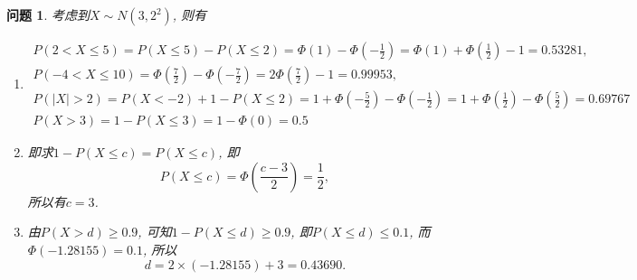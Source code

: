 \documentclass[a4paper]{article}
\theoremstyle{mystyle}
\newtheorem{prob}{问题}[section]
\begin{document}
	\setcounter{prob}{25}
	\begin{prob}
		考虑到$X\sim N(3,2^2)$, 则有
		\begin{enumerate}[{(}1{)}]
			\item
			\begin{gather*}
				P(2<X\leqslant 5)=P(X\leqslant 5)-P(X\leqslant 2)=\varPhi(1)-\varPhi\left(-\frac{1}{2}\right)=\varPhi(1)+\varPhi\left(\frac{1}{2}\right)-1=0.53281,\\
				P(-4<X\leqslant 10)=\varPhi\left(\frac{7}{2}\right)-\varPhi\left(-\frac{7}{2}\right)=2\varPhi\left(\frac{7}{2}\right)-1=0.99953,\\
				P(|X|>2)=P(X<-2)+1-P(X\leqslant 2)=1+\varPhi\left(-\frac{5}{2}\right)-\varPhi\left(-\frac{1}{2}\right)=1+\varPhi\left(\frac{1}{2}\right)-\varPhi\left(\frac{5}{2}\right)=0.69767\\
				P(X>3)=1-P(X\leqslant 3)=1-\varPhi(0)=0.5
			\end{gather*}
			\item
			即求$1-P(X\leqslant c)=P(X\leqslant c)$, 即
			\[
				P(X\leqslant c)=\varPhi\left(\frac{c-3}{2}\right)=\frac{1}{2},
			\]
			所以有$c=3$.
			\item
			由$P(X>d)\geqslant 0.9$, 可知$1-P(X\leqslant d)\geqslant 0.9$, 即$P(X\leqslant d)\leqslant 0.1$, 而$\varPhi(-1.28155)=0.1$, 所以
			\[
				d = 2\times(-1.28155) +3=0.43690.
			\]
		\end{enumerate}
	\end{prob}
\end{document}
